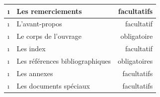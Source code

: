 \documentclass[12pt,twoside,maitrise]{dms}
\theoremstyle{definition}
\numberwithin{equation}{section}
\numberwithin{table}{chapter}
\numberwithin{figure}{chapter}
\begin{document}
\begin{table}[p]
\begin{center}
\begin{tabular}{|l|l|r|}
			\i & Les remerciements                                       & facultatifs  \\\hline
			\i & L'avant-propos                                          & facultatif   \\\hline
			\i & Le corps de l'ouvrage                                   & obligatoire  \\\hline
			\i & Les index                                               & facultatif   \\\hline
			\i & Les références bibliographiques                         & obligatoires \\\hline
			\i & Les annexes                                             & facultatifs  \\\hline
			\i & Les documents spéciaux                                  & facultatifs  \\\hline
		\end{tabular}
	\end{center}
\end{table}
\end{document}
